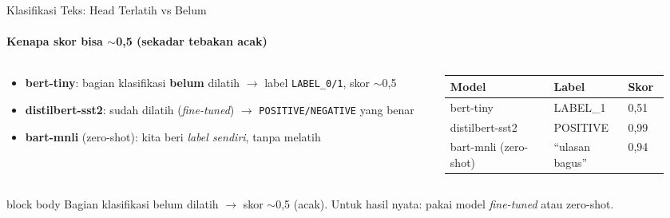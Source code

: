 \documentclass[aspectratio=169,t]{beamer}
\begin{document}
\begin{frame}{Klasifikasi Teks: Head Terlatih vs Belum}
  \framesubtitle{Kenapa skor bisa $\sim$0,5 (sekadar tebakan acak)}
  \begin{columns}[T]
    \begin{column}{0.5\textwidth}
      \begin{itemize}
        \footnotesize
        \item \textbf{bert-tiny}: bagian klasifikasi \textbf{belum} dilatih $\to$ label \texttt{LABEL\_0/1}, skor $\sim$0,5
        \item \textbf{distilbert-sst2}: sudah dilatih (\emph{fine-tuned}) $\to$ \texttt{POSITIVE/NEGATIVE} yang benar
        \item \textbf{bart-mnli} (zero-shot): kita beri \emph{label sendiri}, tanpa melatih
      \end{itemize}
    \end{column}
    \begin{column}{0.48\textwidth}
      \begin{center}
      \renewcommand{\arraystretch}{1.2}
      {\scriptsize
      \setlength{\tabcolsep}{3pt}
      \begin{tabular}{@{}p{0.42\linewidth}p{0.30\linewidth}p{0.16\linewidth}@{}}
        \toprule
        \rowcolor{nvcard!50}
        \textbf{Model} & \textbf{Label} & \textbf{Skor} \\
        \midrule
        bert-tiny & LABEL\_1 & 0,51 \\
        distilbert-sst2 & POSITIVE & 0,99 \\
        bart-mnli (zero-shot) & ``ulasan bagus'' & 0,94 \\
        \bottomrule
      \end{tabular}%
      }
      \end{center}
    \end{column}
  \end{columns}
  \vspace{0.3em}
  \begin{beamercolorbox}[rounded=true,shadow=false,sep=4pt]{block body}
    \centering\small\color{white}
    Bagian klasifikasi belum dilatih $\to$ skor $\sim$0,5 (acak). Untuk hasil nyata: pakai model \emph{fine-tuned} atau zero-shot.
  \end{beamercolorbox}
\end{frame}
\end{document}
